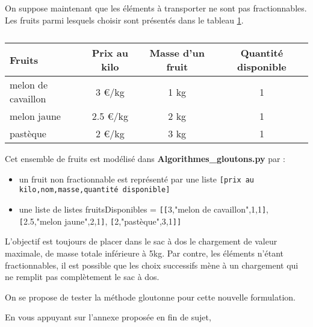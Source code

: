 On suppose maintenant que les éléments à transporter ne sont pas fractionnables. Les fruits parmi lesquels choisir sont présentés dans le tableau \ref{tab_fruit2}.


\begin{table}[h]
	\centering
		\begin{tabular}{|l|c|c|c|}
\hline
Fruits  & Prix au kilo & Masse d’un fruit & Quantité disponible\\
\hline
melon de cavaillon & 3 €/kg & 1 kg & 1\\
melon jaune  & 2.5 €/kg & 2 kg & 1\\
pastèque & 2 €/kg & 3 kg & 1 \\

\hline
		\end{tabular}
		\caption{}
	\label{tab_fruit2}
\end{table}

Cet ensemble de fruits est modélisé dans \textbf{Algorithmes\_gloutons.py} par :
\begin{itemize}
\item un fruit non fractionnable est représenté par une liste \texttt{\verb![!prix au kilo,nom,masse,quantité disponible\verb!]!}
\item une liste de listes fruitsDisponibles = \verb![!\verb![!3,"melon de cavaillon",1,1\verb!]!, \verb![!2.5,"melon jaune",2,1\verb!]!, \verb![!2,"pastèque",3,1\verb!]!\verb!]!
\end{itemize}



L’objectif est toujours de placer dans le sac à dos le chargement de valeur maximale, de masse totale inférieure à 5kg. Par contre, les éléments n’étant fractionnables, il est possible que les choix successifs mène à un chargement qui ne remplit pas complètement le sac à dos.

On se propose de tester la méthode gloutonne pour cette nouvelle formulation. 


En vous appuyant sur l'annexe proposée en fin de sujet,

